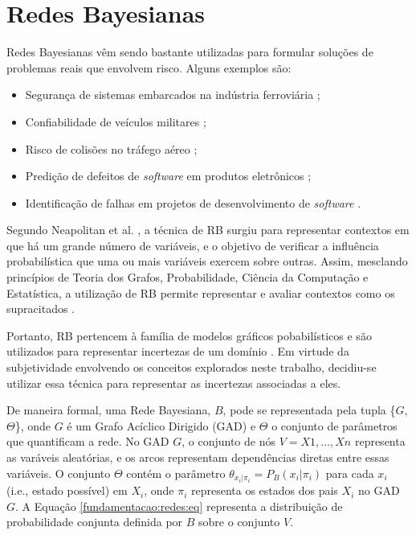 \section{Redes Bayesianas}
\label{fundamentacao:redes}

Redes Bayesianas vêm sendo bastante utilizadas para formular soluções de problemas reais que envolvem risco. Alguns exemplos são:

\begin{itemize}
  \item Segurança de sistemas embarcados na indústria ferroviária \cite{neil};
  \item Confiabilidade de veículos militares \cite{neil2};
  \item Risco de colisões no tráfego aéreo \cite{neil3};
  \item Predição de defeitos de \textit{software} em produtos eletrônicos \cite{neil4} \cite{fenton2} \cite{fenton3} \cite{fenton4};
  \item Identificação de falhas em projetos de desenvolvimento de \textit{software} \cite{perkusich2013} \cite{perkusich2014}.
\end{itemize}

Segundo Neapolitan et al. \cite{neapolitan}, a técnica de RB surgiu para representar contextos em que há um grande número de variáveis, e o objetivo de verificar a influência probabilística que uma ou mais variáveis exercem sobre outras. Assim, mesclando princípios de Teoria dos Grafos, Probabilidade, Ciência da Computação e Estatística, a utilização de RB permite representar e avaliar contextos como os supracitados \cite{bengal}.

Portanto, RB pertencem à família de modelos gráficos pobabilísticos e são utilizados para representar incertezas de um domínio \cite{bengal}. Em virtude da subjetividade envolvendo os conceitos explorados neste trabalho, decidiu-se utilizar essa técnica para representar as incertezas associadas a eles.

De maneira formal, uma Rede Bayesiana, $B$, pode se representada pela tupla \{$G$, $\Theta$\}, onde $G$ é um Grafo Acíclico Dirigido (GAD) e $\Theta$ o conjunto de parâmetros que quantificam a rede. No GAD $G$, o conjunto de nós $V = X1, \ldots,Xn$ representa as varáveis aleatórias, e os arcos representam dependências diretas entre essas variáveis. O conjunto $\Theta$ contém o parâmetro $\theta_{x_{i}|\pi_{i}} = P_{B}(x_{i}|\pi_{i})$ para cada $x_{i}$ (i.e., estado possível) em $X_{i}$, onde $\pi_{i}$ representa os estados dos pais $X_{i}$ no GAD $G$. A Equação \ref{fundamentacao:redes:eq} representa a distribuição de probabilidade conjunta definida por $B$ sobre o conjunto $V$.

